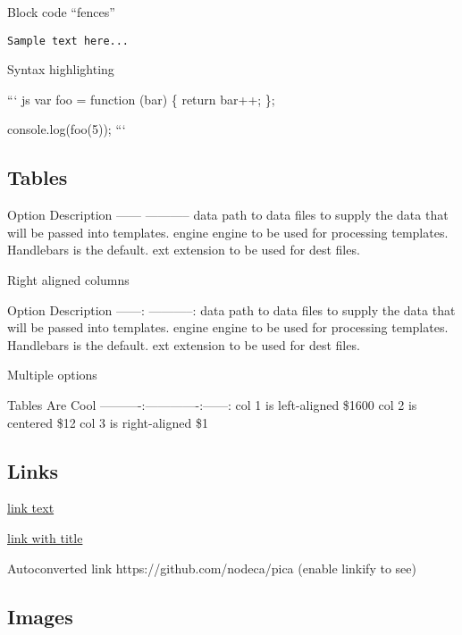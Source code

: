 \documentclass[]{article}
\begin{document}
Block code ``fences''

\texttt{Sample\ text\ here...}

Syntax highlighting

``` js var foo = function (bar) \{ return bar++; \};

console.log(foo(5)); ```

\subsection{Tables}

\textbar{} Option \textbar{} Description \textbar{} \textbar{} ------
\textbar{} ----------- \textbar{} \textbar{} data \textbar{} path to
data files to supply the data that will be passed into templates.
\textbar{} \textbar{} engine \textbar{} engine to be used for processing
templates. Handlebars is the default. \textbar{} \textbar{} ext
\textbar{} extension to be used for dest files. \textbar{}

Right aligned columns

\textbar{} Option \textbar{} Description \textbar{} \textbar{}
------:\textbar{} -----------:\textbar{} \textbar{} data \textbar{} path
to data files to supply the data that will be passed into templates.
\textbar{} \textbar{} engine \textbar{} engine to be used for processing
templates. Handlebars is the default. \textbar{} \textbar{} ext
\textbar{} extension to be used for dest files. \textbar{}

Multiple options

\textbar{} Tables \textbar{} Are \textbar{} Cool \textbar{}
\textbar{}----------\textbar{}:-------------:\textbar{}------:\textbar{}
\textbar{} col 1 is \textbar{} left-aligned \textbar{} \$1600 \textbar{}
\textbar{} col 2 is \textbar{} centered \textbar{} \$12 \textbar{}
\textbar{} col 3 is \textbar{} right-aligned \textbar{} \$1 \textbar{}

\subsection{Links}

\href{http://dev.nodeca.com}{link text}

\href{http://nodeca.github.io/pica/demo/}{link with title}

Autoconverted link https://github.com/nodeca/pica (enable linkify to
see)

\subsection{Images}
\end{document}

